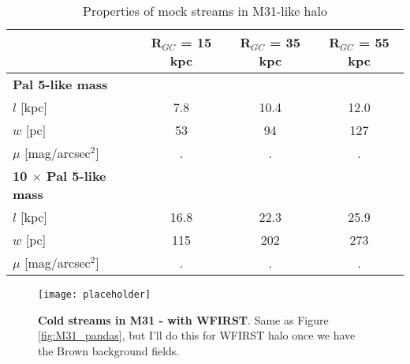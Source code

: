 \documentclass[twocolumn]{aastex62}
\newcommand{\todo}[1]{{\color{red} TODO: #1}}
\begin{document}
\begin{table*}
\centering
\caption{Properties of mock streams in M31-like halo}
\label{tab:Pal5}
\begin{tabular}{lccc}
\hline
 & {\bf R$_{GC}$ = 15 kpc }&  {\bf R$_{GC}$ = 35 kpc} &  {\bf R$_{GC}$ = 55 kpc} \\ 
 \hline
{\bf Pal 5-like mass} & &&\\
$l$ [kpc] & 7.8 & 10.4 &  12.0  \\
$w$ [pc] & 53 & 94  & 127  \\
$\mu$ [mag/arcsec$^2$] &. &.  &.  \\
\hline
{\bf 10 $\times$ Pal 5-like mass} & &&\\ 
$l$ [kpc] &16.8 & 22.3 & 25.9 \\
$w$ [pc]& 115 & 202 & 273  \\
$\mu$ [mag/arcsec$^2$] &. &.  &.  \\

\hline 
\end{tabular}
\end{table*}




\begin{figure}
\centerline{\texttt{[image: placeholder]}}
\caption{{\bf Cold streams in M31 - with WFIRST}. Same as Figure \ref{fig:M31_pandas}, but I'll do this for WFIRST halo once we have the Brown background fields.}
\label{fig:M31_wfirst}
\end{figure}



\end{document}
